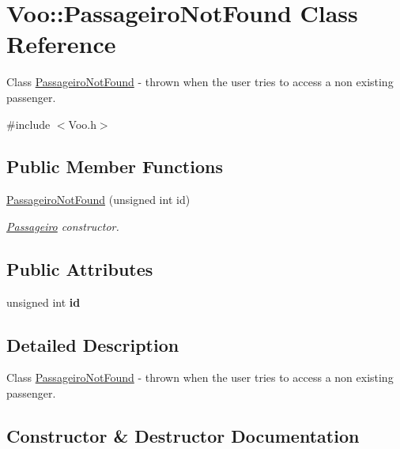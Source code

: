 \hypertarget{class_voo_1_1_passageiro_not_found}{}\section{Voo\+:\+:Passageiro\+Not\+Found Class Reference}
\label{class_voo_1_1_passageiro_not_found}


Class \hyperlink{class_voo_1_1_passageiro_not_found}{Passageiro\+Not\+Found} -\/ thrown when the user tries to access a non existing passenger.  




{\ttfamily \#include $<$Voo.\+h$>$}

\subsection*{Public Member Functions}
\begin{DoxyCompactItemize}
\item 
\hyperlink{class_voo_1_1_passageiro_not_found_afd790a413651a4507788627ddd4bdc66}{Passageiro\+Not\+Found} (unsigned int id)
\begin{DoxyCompactList}\small\item\em \hyperlink{class_passageiro}{Passageiro} constructor. \end{DoxyCompactList}\end{DoxyCompactItemize}
\subsection*{Public Attributes}
\begin{DoxyCompactItemize}
\item 
\mbox{\label{class_voo_1_1_passageiro_not_found_a0c524ee47213bcc4c2947246ddbb6c90}} 
unsigned int {\bfseries id}
\end{DoxyCompactItemize}


\subsection{Detailed Description}
Class \hyperlink{class_voo_1_1_passageiro_not_found}{Passageiro\+Not\+Found} -\/ thrown when the user tries to access a non existing passenger. 

\subsection{Constructor \& Destructor Documentation}
\mbox{\label{class_voo_1_1_passageiro_not_found_afd790a413651a4507788627ddd4bdc66}} 
